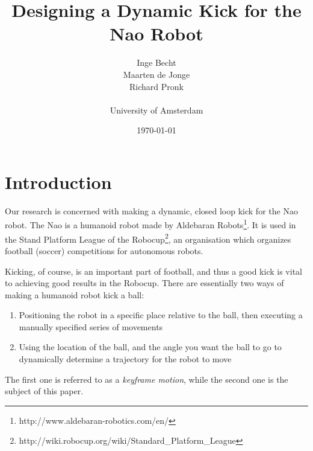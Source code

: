 \documentclass[a4paper]{article}
\begin{document}
\newcommand{\bvect}[1] {\begin{bmatrix} #1 \end{bmatrix}}
\newcommand{\pvect}[1] {\begin{pmatrix} #1 \end{pmatrix}}

\title{Designing a Dynamic Kick for the Nao Robot}
\author{ Inge Becht \\ 
         Maarten de Jonge \\ 
         Richard Pronk \\\\
         \large{University of Amsterdam}}
\date{\today}
\maketitle

\newenvironment{changemargin}[2]{%
\begin{list}{}{%
\setlength{\topsep}{0pt}%
\setlength{\leftmargin}{#1}%
\setlength{\rightmargin}{#2}%
\setlength{\listparindent}{\parindent}%
\setlength{\itemindent}{\parindent}%
\setlength{\parsep}{\parskip}%
}%
\item[]}{\end{list}}

\section{Introduction} 
Our research is concerned with making a dynamic, closed
loop kick for the Nao robot. The Nao is a humanoid robot made by
Aldebaran Robots\footnote{http://www.aldebaran-robotics.com/en/}. It is used in
the Stand Platform League of the
Robocup\footnote{http://wiki.robocup.org/wiki/Standard\_Platform\_League}, an organisation which organizes football (soccer)
competitions for autonomous robots.

Kicking, of course, is an important part of football, and thus a good kick is vital to achieving good results in the Robocup. There are essentially two ways of making a humanoid robot kick a ball:
\begin{enumerate}
  \item Positioning the robot in a specific place relative to the ball, then executing a manually specified series of movements
  \item Using the location of the ball, and the angle you want the ball to go to dynamically determine a trajectory for the robot to move
\end{enumerate}
The first one is referred to as a \emph{keyframe motion}, while the second one is the subject of this paper.
\end{document}
